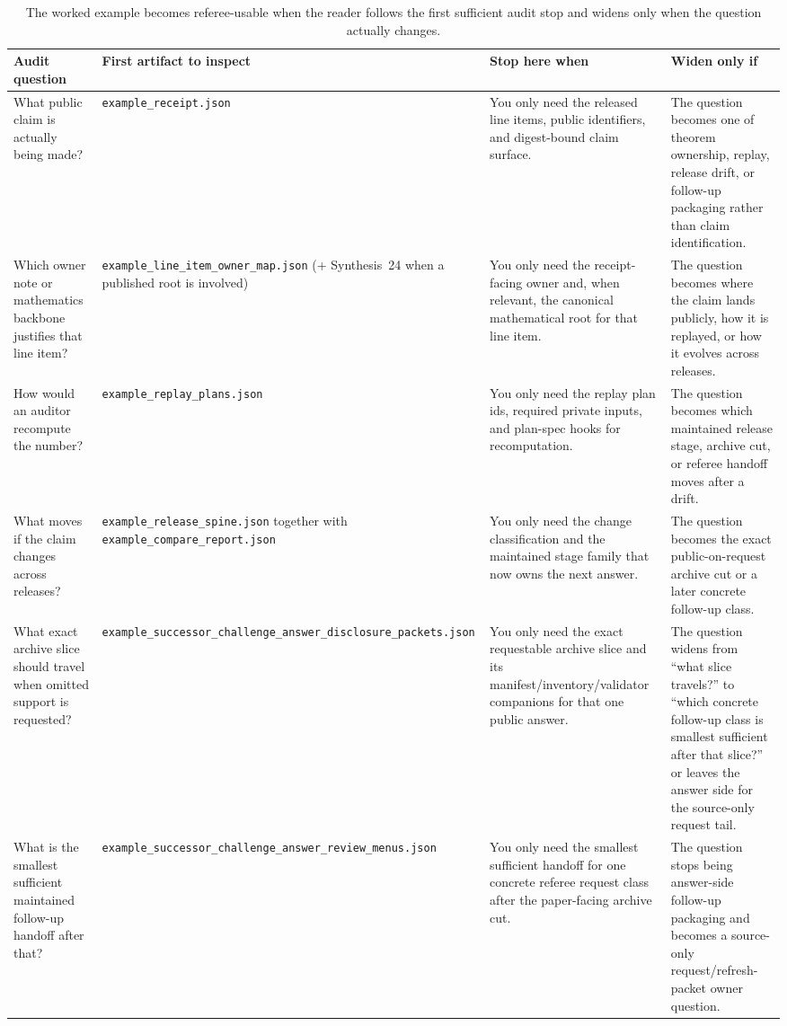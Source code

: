 \documentclass[11pt]{article}
\begin{document}
\begin{table}[ht]
\centering
\small
\begin{tabularx}{\linewidth}{@{}l l X X@{}}
\toprule
Audit question & First artifact to inspect & Stop here when & Widen only if \\
\midrule
What public claim is actually being made? & \texttt{example\_receipt.json} & You only need the released line items, public identifiers, and digest-bound claim surface. & The question becomes one of theorem ownership, replay, release drift, or follow-up packaging rather than claim identification. \\
Which owner note or mathematics backbone justifies that line item? & \texttt{example\_line\_item\_owner\_map.json} (+ Synthesis~24 when a published root is involved) & You only need the receipt-facing owner and, when relevant, the canonical mathematical root for that line item. & The question becomes where the claim lands publicly, how it is replayed, or how it evolves across releases. \\
How would an auditor recompute the number? & \texttt{example\_replay\_plans.json} & You only need the replay plan ids, required private inputs, and plan-spec hooks for recomputation. & The question becomes which maintained release stage, archive cut, or referee handoff moves after a drift. \\
What moves if the claim changes across releases? & \texttt{example\_release\_spine.json} together with \texttt{example\_compare\_report.json} & You only need the change classification and the maintained stage family that now owns the next answer. & The question becomes the exact public-on-request archive cut or a later concrete follow-up class. \\
What exact archive slice should travel when omitted support is requested? & \texttt{example\_successor\_challenge\_answer\_disclosure\_packets.json} & You only need the exact requestable archive slice and its manifest/inventory/validator companions for that one public answer. & The question widens from ``what slice travels?'' to ``which concrete follow-up class is smallest sufficient after that slice?'' or leaves the answer side for the source-only request tail. \\
What is the smallest sufficient maintained follow-up handoff after that? & \texttt{example\_successor\_challenge\_answer\_review\_menus.json} & You only need the smallest sufficient handoff for one concrete referee request class after the paper-facing archive cut. & The question stops being answer-side follow-up packaging and becomes a source-only request/refresh-packet owner question. \\
\bottomrule
\end{tabularx}
\caption{The worked example becomes referee-usable when the reader follows the first sufficient audit stop and widens only when the question actually changes.}
\label{tab:workedexample-auditwalk}
\end{table}
\end{document}

